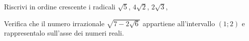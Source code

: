 \begin{esercizio}%
Riscrivi in ordine crescente i radicali \(\sqrt 5\), \(4\sqrt 2\), 
\(2\sqrt 3\),
\end{esercizio}

\begin{esercizio}%
Verifica che il numero irrazionale \(\sqrt{7-2\sqrt 6}\) appartiene 
all'intervallo \((1; 2)\) e rappresentalo sull'asse dei numeri reali.
\end{esercizio}


% 
% 

